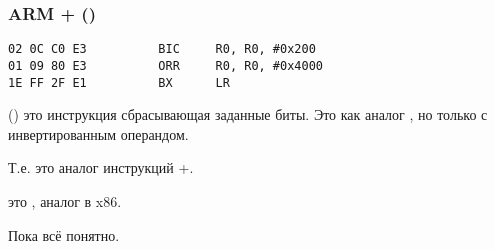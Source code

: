 \subsubsection{ARM + \OptimizingKeilVI (\ARMMode)}

\begin{lstlisting}[caption=\OptimizingKeilVI (\ARMMode),style=customasmARM]
02 0C C0 E3          BIC     R0, R0, #0x200
01 09 80 E3          ORR     R0, R0, #0x4000
1E FF 2F E1          BX      LR
\end{lstlisting}

 () это инструкция сбрасывающая заданные биты. 
Это как аналог \AND, но только с инвертированным операндом.

Т.е. это аналог инструкций \NOT+\AND.

 это , аналог \OR в x86.

Пока всё понятно.

